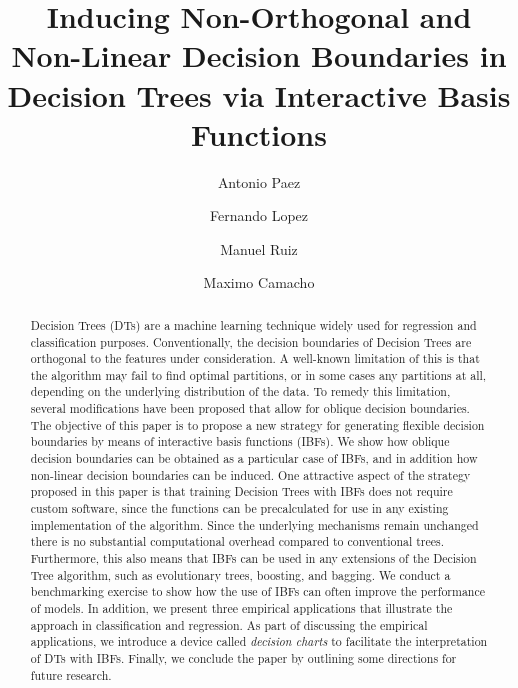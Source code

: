\documentclass[]{elsarticle} %
\begin{document}
\begin{frontmatter}

  \title{Inducing Non-Orthogonal and Non-Linear Decision Boundaries in Decision
Trees via Interactive Basis Functions}
    \author[McMaster University]{Antonio Paez}
    \author[Universidad Politecnica de Cartagena]{Fernando Lopez}
  
    \author[Universidad Politecnica de Cartagena]{Manuel Ruiz}
  
    \author[Universidad de Murcia]{Maximo Camacho}
  
      \address[McMaster University]{School of Geography and Earth Sciences, 1280 Main Street West, Hamilton
ON, Canada L8S 4K1}
    \address[Universidad Politecnica de Cartagena]{Facultad de Ciencias de la Empresa, Dept. de Métodos Cuantitativos e
Informáticos, Calle Real, 3, 30201 Cartagena, Murcia, España}
    \address[Universidad de Murcia]{Facultad de Economía y Empresa, Dept. de Métodos Cuantitativos para la
Economía y la Empresa, 30100 Murcia, Murcia, España}
  
  \begin{abstract}
  Decision Trees (DTs) are a machine learning technique widely used for
  regression and classification purposes. Conventionally, the decision
  boundaries of Decision Trees are orthogonal to the features under
  consideration. A well-known limitation of this is that the algorithm may
  fail to find optimal partitions, or in some cases any partitions at all,
  depending on the underlying distribution of the data. To remedy this
  limitation, several modifications have been proposed that allow for
  oblique decision boundaries. The objective of this paper is to propose a
  new strategy for generating flexible decision boundaries by means of
  interactive basis functions (IBFs). We show how oblique decision
  boundaries can be obtained as a particular case of IBFs, and in addition
  how non-linear decision boundaries can be induced. One attractive aspect
  of the strategy proposed in this paper is that training Decision Trees
  with IBFs does not require custom software, since the functions can be
  precalculated for use in any existing implementation of the algorithm.
  Since the underlying mechanisms remain unchanged there is no substantial
  computational overhead compared to conventional trees. Furthermore, this
  also means that IBFs can be used in any extensions of the Decision Tree
  algorithm, such as evolutionary trees, boosting, and bagging. We conduct
  a benchmarking exercise to show how the use of IBFs can often improve
  the performance of models. In addition, we present three empirical
  applications that illustrate the approach in classification and
  regression. As part of discussing the empirical applications, we
  introduce a device called \emph{decision charts} to facilitate the
  interpretation of DTs with IBFs. Finally, we conclude the paper by
  outlining some directions for future research.
  \end{abstract}
  
 \end{frontmatter}
\end{document}
